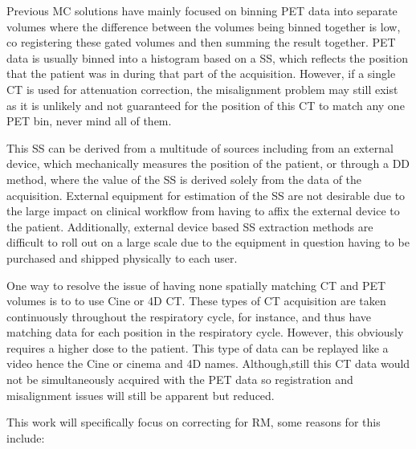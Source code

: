         Previous \gls{MC} solutions have mainly focused on binning \gls{PET} data into separate volumes where the difference between the volumes being binned together is low, co registering these gated volumes and then summing the result together. \gls{PET} data is usually binned into a histogram based on a \gls{SS}, which reflects the position that the patient was in during that part of the acquisition. However, if a single \gls{CT} is used for attenuation correction, the misalignment problem may still exist as it is unlikely and not guaranteed for the position of this \gls{CT} to match any one \gls{PET} bin, never mind all of them.
        
        This \gls{SS} can be derived from a multitude of sources including from an external device, which mechanically measures the position of the patient, or through a \gls{DD} method, where the value of the \gls{SS} is derived solely from the data of the acquisition. External equipment for estimation of the \gls{SS} are not desirable due to the large impact on clinical workflow from having to affix the external device to the patient. Additionally, external device based \gls{SS} extraction methods are difficult to roll out on a large scale due to the equipment in question having to be purchased and shipped physically to each user.
        
        One way to resolve the issue of having none spatially matching \gls{CT} and \gls{PET} volumes is to to use Cine or \gls{4D} \gls{CT}. These types of \gls{CT} acquisition are taken continuously throughout the respiratory cycle, for instance, and thus have matching data for each position in the respiratory cycle. However, this obviously requires a higher dose to the patient. This type of data can be replayed like a video hence the Cine or cinema and \gls{4D} names. Although,still this \gls{CT} data would not be simultaneously acquired with the \gls{PET} data so registration and misalignment issues will still be apparent but reduced. 
        
        This work will specifically focus on correcting for \gls{RM}, some reasons for this include:
        
